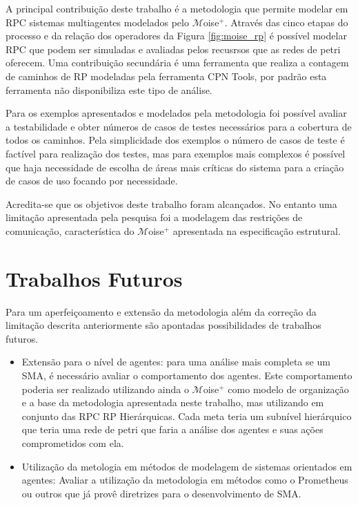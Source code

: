 A principal contribuição deste trabalho é a metodologia que permite modelar em RPC sistemas multiagentes modelados pelo $\mathcal{M}$oise$^{+}$. Através das cinco etapas do processo e da  relação dos operadores da Figura \ref{fig:moise_rp} é possível modelar RPC que podem ser simuladas e avaliadas pelos recusrsos que as redes de petri oferecem. Uma contribuição secundária é uma ferramenta que realiza a contagem de caminhos de RP modeladas pela ferramenta CPN Tools, por padrão esta ferramenta não disponibiliza este tipo de análise.

Para os exemplos apresentados e modelados pela metodologia foi possível avaliar a testabilidade e obter números de casos de testes necessários para a cobertura de todos os caminhos. Pela simplicidade dos exemplos o número de casos de teste é factível para realização dos testes, mas para exemplos mais complexos é possível que haja necessidade de escolha de áreas mais críticas do sistema para a criação de casos de uso focando por necessidade.

Acredita-se que os objetivos deste trabalho foram alcançados. No entanto uma limitação apresentada pela pesquisa foi a modelagem das restrições de comunicação, característica do  $\mathcal{M}$oise$^{+}$ apresentada na especificação estrutural.

\section{Trabalhos Futuros}

Para um aperfeiçoamento e extensão da metodologia além da correção da limitação descrita anteriormente são apontadas  possibilidades de trabalhos futuros.

\begin{itemize}
\item Extensão para o nível de agentes: para uma análise mais completa se um SMA, é necessário avaliar o comportamento dos agentes. Este comportamento poderia ser realizado utilizando ainda o $\mathcal{M}$oise$^{+}$ como modelo de organização e a base da metodologia apresentada neste trabalho, mas utilizando em conjunto das RPC RP Hierárquicas. Cada meta teria um subnível hierárquico que teria uma rede de petri que faria a análise dos agentes e suas ações comprometidos com ela.

\item Utilização da metologia em métodos de modelagem de sistemas orientados em agentes: Avaliar a utilização da metodologia em métodos como o Prometheus ou outros que já provê diretrizes para o desenvolvimento de SMA.
\end{itemize}


